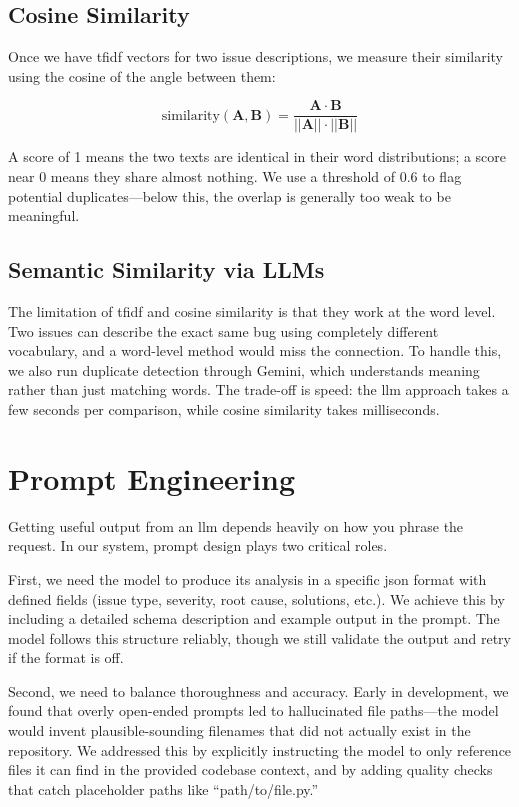 \subsection{Cosine Similarity}
Once we have \gls{tfidf} vectors for two issue descriptions, we measure their similarity using the cosine of the angle between them:

\begin{equation}
\label{eqn:cosine}
\text{similarity}(\mathbf{A}, \mathbf{B}) = \frac{\mathbf{A} \cdot \mathbf{B}}{||\mathbf{A}|| \cdot ||\mathbf{B}||}
\end{equation}

A score of 1 means the two texts are identical in their word distributions; a score near 0 means they share almost nothing. We use a threshold of 0.6 to flag potential duplicates---below this, the overlap is generally too weak to be meaningful.

\subsection{Semantic Similarity via LLMs}
The limitation of \gls{tfidf} and cosine similarity is that they work at the word level. Two issues can describe the exact same bug using completely different vocabulary, and a word-level method would miss the connection. To handle this, we also run duplicate detection through Gemini, which understands meaning rather than just matching words. The trade-off is speed: the \gls{llm} approach takes a few seconds per comparison, while cosine similarity takes milliseconds.

\section{Prompt Engineering}

Getting useful output from an \gls{llm} depends heavily on how you phrase the request. In our system, prompt design plays two critical roles.

First, we need the model to produce its analysis in a specific \gls{json} format with defined fields (issue type, severity, root cause, solutions, etc.). We achieve this by including a detailed schema description and example output in the prompt. The model follows this structure reliably, though we still validate the output and retry if the format is off.

Second, we need to balance thoroughness and accuracy. Early in development, we found that overly open-ended prompts led to hallucinated file paths---the model would invent plausible-sounding filenames that did not actually exist in the repository. We addressed this by explicitly instructing the model to only reference files it can find in the provided codebase context, and by adding quality checks that catch placeholder paths like ``path/to/file.py.''

